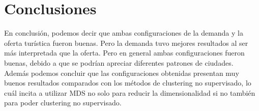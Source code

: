 \documentclass[11pt,letterpaper]{article}
\begin{document}
\section{Conclusiones}

En conclusión, podemos decir que ambas configuraciones de la demanda y la oferta turística fueron buenas. Pero la demanda tuvo mejores resultados al ser más interpretada que la oferta. Pero en general ambas configuraciones fueron buenas, debido a que se podrían apreciar diferentes patrones de ciudades. \\

Además podemos concluir que las configuraciones obtenidas presentan muy buenos resultados comparados con los métodos de clustering no supervisado, lo cuál incita a utilizar MDS no solo para reducir la dimensionalidad si no también para poder clustering no supervisado.







\printbibliography
\end{document}
